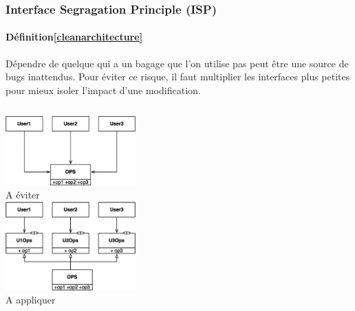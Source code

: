 \documentclass{beamer}
\begin{document}
    \begin{frame}
        \transdissolve
        \frametitle{Interface Segragation Principle (ISP)}
        \framesubtitle{Définition\cref{cleanarchitecture}}
        Dépendre de quelque qui a un bagage que l'on utilise pas peut être une source de bugs inattendus.
        \bigbreak
        Pour éviter ce risque, il faut multiplier les interfaces plus petites pour mieux isoler l'impact d'une modification.
        \begin{columns}
            \centering
            \includegraphics[width=5cm]{image/i-to-avoid} \\ A éviter \\
            \centering
            \includegraphics[width=5cm]{image/i-preferred} \\ A appliquer \\
        \end{columns}
    \end{frame}
\end{document}
